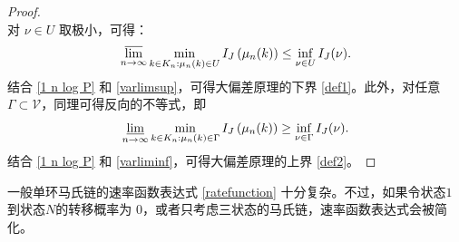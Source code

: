 \begin{proof}
\begin{equation*}
\end{equation*}
对 $\nu\in U$ 取极小，可得：
\begin{equation}\label{varlimsup}
\varlimsup_{n\to\infty}\min_{k\in K_n: \mu_n(k) \in U}I_J\left(\mu_{n}(k)\right)\le \inf_{\nu\in U}I_J(\nu).
\end{equation}
结合 \eqref{1 n log P} 和 \eqref{varlimsup}，可得大偏差原理的下界 \eqref{def1}。此外，对任意$\Gamma \subset \mathcal{V}$，同理可得反向的不等式，即
\begin{equation}\label{varliminf}
\varliminf_{n\to\infty}\min_{k\in K_n: \mu_n(k) \in \Gamma}I_J\left(\mu_{n}(k)\right)\ge \inf_{\nu\in \Gamma}I_J(\nu).
\end{equation}
结合 \eqref{1 n log P} 和 \eqref{varliminf}，可得大偏差原理的上界 \eqref{def2}。
\end{proof}

一般单环马氏链的速率函数表达式 \eqref{ratefunction} 十分复杂。不过，如果令状态$1$到状态$N$的转移概率为 0，或者只考虑三状态的马氏链，速率函数表达式会被简化。


